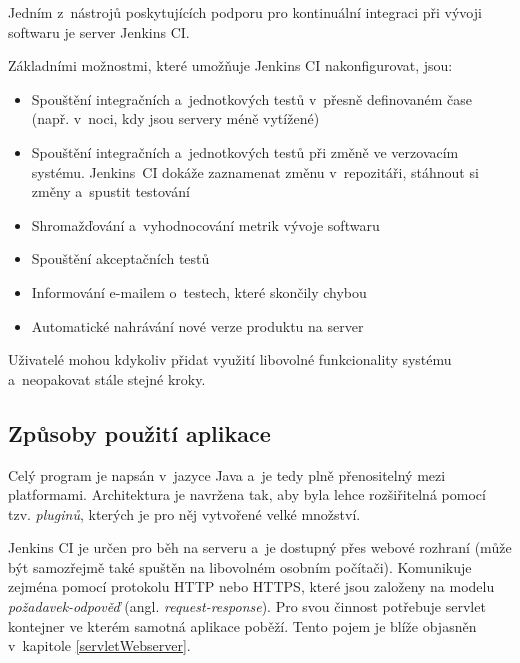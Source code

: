             Jedním z~nástrojů poskytujících podporu pro kontinuální integraci při vývoji softwaru je 
            server Jenkins CI. 
            
            \medskip \noindent Základními možnostmi, které umožňuje Jenkins CI nakonfigurovat, jsou:
            
            \begin{itemize}
                \item Spouštění integračních a~jednotkových testů v~přesně definovaném čase (např. v~noci, kdy jsou servery méně vytížené)
                \item Spouštění integračních a~jednotkových testů při změně ve verzovacím systému. Jenkins~CI dokáže zaznamenat změnu v~repozitáři,
                    stáhnout si změny a~spustit testování
                \item Shromažďování a~vyhodnocování metrik vývoje softwaru
                \item Spouštění akceptačních testů
                \item Informování e-mailem o~testech, které skončily chybou
                \item Automatické nahrávání nové verze produktu na server
            \end{itemize} 

            Uživatelé mohou kdykoliv přidat využití libovolné funkcionality systému a~neopakovat stále stejné kroky. 
            

        \subsection{Způsoby použití aplikace}
            Celý program je napsán v~jazyce Java a~je tedy plně přenositelný mezi platformami. Architektura je navržena tak, aby byla 
            lehce rozšiřitelná pomocí tzv. \emph{pluginů}, kterých je pro něj vytvořené velké množství. 
            
            Jenkins CI je určen pro běh na serveru a~je dostupný přes webové rozhraní (může být samozřejmě také spuštěn
            na libovolném osobním počítači). 
            Komunikuje zejména pomocí protokolu HTTP nebo HTTPS, 
            které jsou založeny na modelu \emph{požadavek-odpověď} (angl. \emph{request-response}).  
            Pro svou činnost potřebuje servlet kontejner ve kterém samotná 
            aplikace poběží.
            Tento pojem je blíže objasněn v~kapitole \ref{servletWebserver}.

